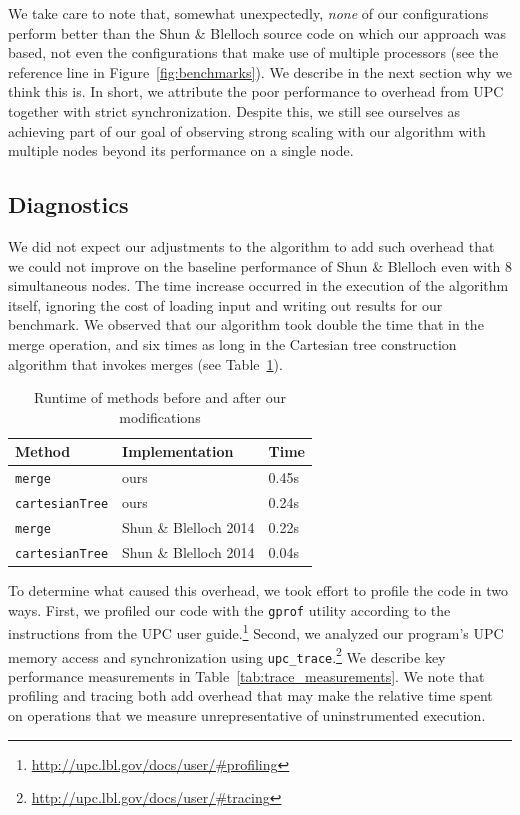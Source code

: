 \documentclass[10pt]{article}
\begin{document}
We take care to note that, somewhat unexpectedly, \emph{none} of our configurations perform better
than the Shun \& Blelloch source code on which our approach was based, not even the configurations
that make use of multiple processors (see the reference line in Figure~\ref{fig:benchmarks}).
We describe in the next section why we think this is.
In short, we attribute the poor performance to overhead from UPC together with strict 
synchronization.
Despite this, we still see ourselves as achieving part of our goal of observing strong scaling with
our algorithm with multiple nodes beyond its performance on a single node.

\subsection{Diagnostics}

We did not expect our adjustments to the algorithm to add such overhead that we could not
improve on the baseline performance of Shun \& Blelloch even with 8 simultaneous nodes.
The time increase occurred in the execution of the algorithm itself, ignoring the cost of loading
input and writing out results for our benchmark.
We observed that our algorithm took double the time that in the merge operation, and six times
as long in the Cartesian tree construction algorithm that invokes merges
(see Table~\ref{tab:method_performance}).

\begin{table}[t]
\caption{Runtime of methods before and after our modifications}
\vspace{1.5ex}
\label{tab:method_performance}
\centering
\begin{tabular}{lll}
\toprule
\textbf{Method} & \textbf{Implementation} & \textbf{Time} \\
\midrule
\texttt{merge} & ours & 0.45s \\
\midrule
\texttt{cartesianTree} & ours & 0.24s \\
\midrule
\texttt{merge} & Shun \& Blelloch 2014 & 0.22s \\
\midrule
\texttt{cartesianTree} & Shun \& Blelloch 2014 & 0.04s \\
\bottomrule
\end{tabular}
\end{table}

To determine what caused this overhead, we took effort to profile the code in two ways.
First, we profiled our code with the \texttt{gprof} utility according to the instructions from
the UPC user guide.\footnote{\url{http://upc.lbl.gov/docs/user/#profiling}}
Second, we analyzed our program's UPC memory access and synchronization using 
\texttt{upc\_trace}.\footnote{\url{http://upc.lbl.gov/docs/user/#tracing}}
We describe key performance measurements in Table~\ref{tab:trace_measurements}.
We note that profiling and tracing both add overhead that may make the relative time spent on
operations that we measure unrepresentative of uninstrumented execution.
\end{document}
